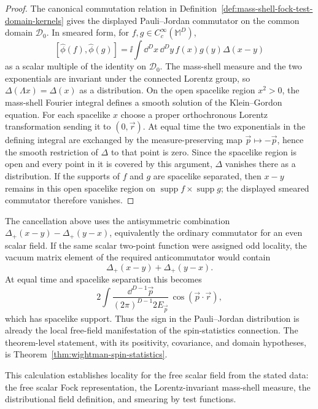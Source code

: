 \begin{proof}
The canonical commutation relation in
Definition~\ref{def:mass-shell-fock-test-domain-kernels} gives the displayed
Pauli--Jordan commutator on the common domain \(\mathcal D_0\).  In smeared
form, for \(f,g\in C_c^\infty(\mathbb M^D)\),
\[
  [\widehat\phi(f),\widehat\phi(g)]
  =
  \ii\int \dd^Dx\,\dd^Dy\, f(x)g(y)\Delta(x-y)
\]
as a scalar multiple of the identity on \(\mathcal D_0\).  The mass-shell
measure and the two exponentials are invariant under the connected Lorentz
group, so \(\Delta(\Lambda x)=\Delta(x)\) as a distribution.  On the open
spacelike region \(x^2>0\), the mass-shell Fourier integral defines a smooth
solution of the Klein--Gordon equation.  For each spacelike \(x\) choose a
proper orthochronous Lorentz transformation sending it to \((0,\vec r)\).
At equal time the two exponentials in the defining integral are exchanged by
the measure-preserving map \(\vec p\mapsto-\vec p\), hence the smooth
restriction of \(\Delta\) to that point is zero.  Since the spacelike region
is open and every point in it is covered by this argument, \(\Delta\) vanishes
there as a distribution.  If the supports of \(f\) and \(g\) are spacelike
separated, then \(x-y\) remains in this open spacelike region on
\(\operatorname{supp}f\times\operatorname{supp}g\); the displayed smeared
commutator therefore vanishes.
\end{proof}

\begin{remark}
\label{rem:scalar-odd-locality-fails}
The cancellation above uses the antisymmetric combination
\(\Delta_+(x-y)-\Delta_+(y-x)\), equivalently the ordinary commutator for an
even scalar field.  If the same scalar two-point function were assigned odd
locality, the vacuum matrix element of the required anticommutator would contain
\[
  \Delta_+(x-y)+\Delta_+(y-x).
\]
At equal time and spacelike separation this becomes
\[
  2\int
  \frac{\dd^{D-1}\vec p}{(2\pi)^{D-1}2E_{\vec p}}\,
  \cos(\vec p\cdot\vec r),
\]
which has spacelike support.  Thus the sign in the Pauli--Jordan distribution
is already the local free-field manifestation of the spin-statistics
connection.  The theorem-level statement, with its positivity, covariance, and
domain hypotheses, is Theorem~\ref{thm:wightman-spin-statistics}.
\end{remark}

This calculation establishes locality for the free scalar field from the
stated data: the free scalar Fock representation, the Lorentz-invariant
mass-shell measure, the distributional field definition, and smearing by test
functions.

